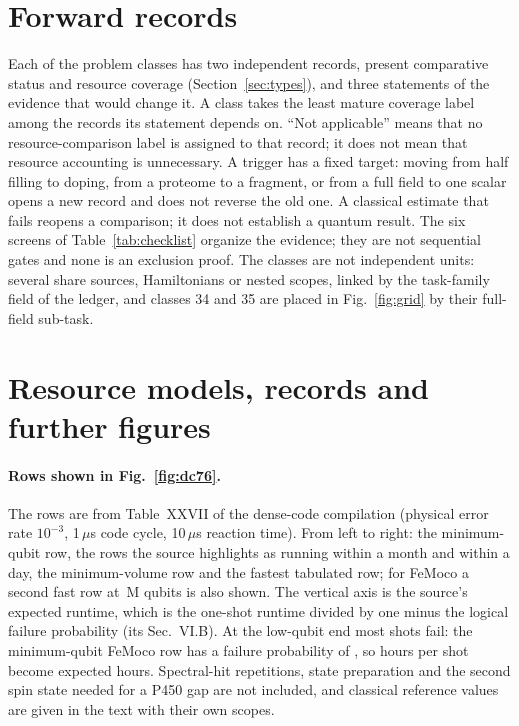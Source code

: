

\section{Forward records}
\label{app:forward}
Each of the \nClasses{} problem classes has two independent records, present comparative status and resource coverage (Section~\ref{sec:types}), and three statements of the evidence that would change it. A class takes the least mature coverage label among the records its statement depends on. ``Not applicable'' means that no resource-comparison label is assigned to that record; it does not mean that resource accounting is unnecessary. A trigger has a fixed target: moving from half filling to doping, from a proteome to a fragment, or from a full field to one scalar opens a new record and does not reverse the old one. A classical estimate that fails reopens a comparison; it does not establish a quantum result. The six screens of Table~\ref{tab:checklist} organize the evidence; they are not sequential gates and none is an exclusion proof. The classes are not independent units: several share sources, Hamiltonians or nested scopes, linked by the task-family field of the ledger, and classes 34 and 35 are placed in Fig.~\ref{fig:grid} by their full-field sub-task.





\section{Resource models, records and further figures}
\label{app:models}

\paragraph{Rows shown in Fig.~\ref{fig:dc76}.} The rows are from Table~XXVII of the dense-code compilation (physical error rate $10^{-3}$, 1\,$\mu$s code cycle, 10\,$\mu$s reaction time). From left to right: the minimum-qubit row, the rows the source highlights as running within a month and within a day, the minimum-volume row and the fastest tabulated row; for FeMoco a second fast row at \femoSevSelQ\,M qubits is also shown. The vertical axis is the source's expected runtime, which is the one-shot runtime divided by one minus the logical failure probability (its Sec.~VI.B). At the low-qubit end most shots fail: the minimum-qubit FeMoco row has a failure probability of \femoMinqPfail, so \femoMinqShot{} hours per shot become \femoMinqH{} expected hours. Spectral-hit repetitions, state preparation and the second spin state needed for a P450 gap are not included, and classical reference values are given in the text with their own scopes.

